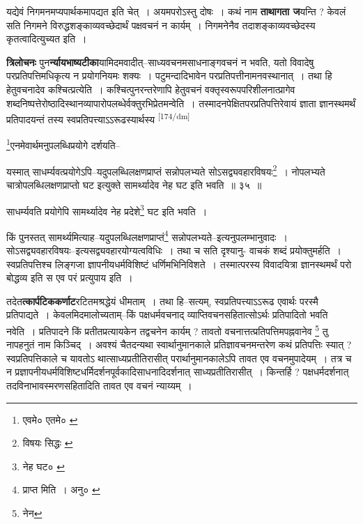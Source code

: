 \documentclass[article,12pt,a4paper]{memoir}
\begin{document}
	  \pstart यद्येवं निगमनमप्यपार्थकमापद्यत इति चेत् । अयमपरोऽस्तु दोषः । कथं नाम \textbf{ताथागता ज}यन्ति ? केवलं सति निगमने विरुद्धशङ्काव्यवच्छेदार्थं पक्षवचनं न कार्यम् । निगमनेनैव तदाशङ्काव्यवच्छेदस्य कृतत्वादित्युच्यत इति ।
	\pend
      

	  \pstart \textbf{त्रिलोचनः} पुन\textbf{र्न्यायभाष्यटीका}यामिदमवादीत्--साध्यवचनमसाधनाङ्गवचनं न भवति, यतो विवादेषु परप्रतिपत्तिमधिकृत्य न प्रयोगनियमः शक्यः । पटुमन्दादिभावेन परप्रतिपत्तीनामनवस्थानात् । तथा हि हेतुवचनादेव कश्चित्प्रत्येति । कश्चित्पुनरन्तरेणापि हेतुवचनं वक्तृस्वरूपपरिशीलनात्प्रागेव शब्दनिष्पत्तेरोष्ठादिस्थानव्यापारोपलब्धेर्वक्तुरभिप्रेतमन्वेति । तस्मादनपेक्षितपरप्रतिपत्तिरेवायं ज्ञाता ज्ञानस्थमर्थं प्रतिपादयन्तं तस्य स्वप्रतिपत्त्याऽऽरूढस्यार्थस्य \leavevmode\textsuperscript{\rmlatinfont\tiny [174/dm]} 
	  
	\footnote{एवमे० \cite{dp-msA} \cite{dp-msB} \cite{dp-edP} \cite{dp-edH} \cite{dp-edE} एतमे० \cite{dp-edN}}एनमेवार्थमनुपलब्धिप्रयोगे दर्शयति-- 
	  
	यस्मात् साधर्म्यवत्प्रयोगेऽपि--यदुपलब्धिलक्षणप्राप्तं सन्नोपलभ्यते सोऽसद्व्यवहारविषयः\footnote{विषयः सिद्धः \cite{dp-msC}} । नोपलभ्यते चात्रोपलब्धिलक्षणप्राप्तो घट इत्युक्ते सामर्थ्यादेव नेह घट इति भवति ॥ ३५ ॥ 
	  
	साधर्म्यवति प्रयोगेपि सामर्थ्यादेव नेह प्रदेशे\footnote{नेह घट० \cite{dp-msA} \cite{dp-msB} \cite{dp-edP} \cite{dp-edH} \cite{dp-edN}} घट इति भवति । 
	  
	किं पुनस्तत् सामर्थ्यमित्याह--यदुपलब्धिलक्षणप्राप्तं\footnote{प्राप्त मिति । अनु० \cite{dp-msA} \cite{dp-edP} \cite{dp-edH}} सन्नोपलभ्यते--इत्यनुपलम्भानुवादः । सोऽसद्व्यवहारविषयः--इत्यसद्व्यवहारयोग्यत्वविधिः । तथा च सति दृश्यानु- वाचकं शब्दं प्रयोक्तुमर्हति । स्वप्रतिपत्तिश्च लिङ्गजा ज्ञापनीयधर्मविशिष्टं धर्णिमभिनिविशते । तस्मात्परस्य विवादयित्रा ज्ञानस्थमर्थं परो बोद्धव्य इति स एव परं प्रत्युपाय इति ।
	\pend
      

	  \pstart तदेत\textbf{त्कार्पटिककर्णाट}रटितमश्रद्धेयं धीमताम् । तथा हि--सत्यम्, स्वप्रतिपत्त्याऽऽरूढ एवार्थः परस्मै प्रतिपाद्यते । केवलमिदमालोच्यताम्--किं पक्षधर्मवचनाद् व्याप्तिवचनसहितात्सोऽर्थः प्रतिपादितो भवति नवेति । प्रतिपादने किं प्रतीतप्रत्यायकेन तद्वचनेन कार्यम् ? तावतो वचनात्तत्प्रतिपत्तिमपह्नवानेव \footnote{नेन} तु नापहनुतं नाम किञ्चिद् । अवश्यं चैतदन्यथा स्वार्थानुमानकाले प्रतिज्ञावचनमन्तरेण कथं प्रतिपत्तिः स्यात् ? स्वप्रतिपत्तिकाले च यावतोऽ थात्साध्यप्रतीतिरासीत् परार्थानुमानकालेऽपि तावत एव वचनमुपादेयम् । तत्र च न प्रज्ञापनीयधर्मविशिष्टधर्मिदर्शनपूर्वकादिसाधनादिदर्शनात् साध्यप्रतीतिरासीत् । किन्तर्हि ? पक्षधर्मदर्शनात् तदविनाभावस्मरणसहितादिति तावत एव वचनं न्याय्यम् ।
	\pend
      
\end{document}
